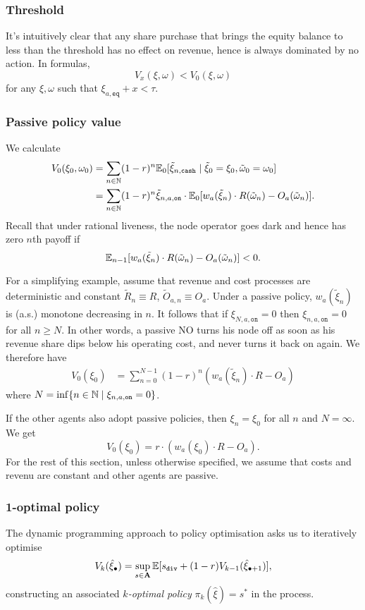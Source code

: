 \subsubsection{Threshold}
%
It's intuitively clear that any share purchase that brings the equity balance to less than the threshold has no effect on revenue, hence is always dominated by no action.
%
In formulas,
\[
  V_x(\xi,\omega) < V_0(\xi,\omega) 
\]
for any $\xi,\omega$ such that $\xi_{a,\mathtt{eq}}+x <\tau$.

\subsubsection{Passive policy value}

We calculate
\begin{align*}
  V_0(\xi_0,\omega_0) &= \sum_{n\in\mathbb{N}}(1-r)^n \mathbb{E}_0[\tilde\xi_{n,\mathtt{cash}} \mid \tilde\xi_0=\xi_0, \tilde\omega_0=\omega_0 ] \\
  &= \sum_{n\in\mathbb{N}}(1-r)^n \tilde\xi_{n,a,\mathtt{on}} \cdot \mathbb{E}_0[ w_a(\tilde\xi_n)\cdot R(\tilde\omega_n) - O_a(\tilde\omega_n) ].
\end{align*}
Recall that under rational liveness, the node operator goes dark and hence has zero $n$th payoff if 
\[
  \mathbb{E}_{n-1}[w_a(\tilde\xi_n)\cdot R(\tilde\omega_n) - O_a(\tilde\omega_n) ] < 0.
\]

For a simplifying example, assume that revenue and cost processes are deterministic and constant $\tilde{R}_n\equiv R$, $\tilde{O}_{a,n}\equiv O_a$.
%
Under a passive policy, $w_a(\tilde \xi_n)$ is (a.s.) monotone decreasing in $n$.
%
It follows that if $\xi_{N,a,\mathtt{on}}=0$ then $\xi_{n,a,\mathtt{on}}=0$ for all $n\geq N$.
%
In other words, a passive NO turns his node off as soon as his revenue share dips below his operating cost, and never turns it back on again.
%
We therefore have
\begin{align*}
  V_0(\xi_0) &= \sum_{n=0}^{N-1}(1-r)^n (w_a(\tilde\xi_n)\cdot R - O_a)
\end{align*}
where $N=\inf\{n\in\mathbb{N}\mid \xi_{n,a,\mathtt{on}}=0\}$.

If the other agents also adopt passive policies, then $\xi_n=\xi_0$ for all $n$ and $N=\infty$.
%
We get
\[
  V_0(\xi_0) = r\cdot (w_a(\xi_0)\cdot R - O_a).
\]
%
For the rest of this section, unless otherwise specified, we assume that costs and revenu are constant and other agents are passive.

\subsubsection{1-optimal policy} 
%
The dynamic programming approach to policy optimisation asks us to iteratively optimise
\[
  V_k(\hat{\xi}_\bullet) = \sup_{s\in\mathbf{A}} \mathbb{E}[s_\mathtt{div} + (1-r) V_{k-1}(\hat{\xi}_{\bullet+1}) ],
\]
constructing an associated \emph{$k$-optimal policy} $\pi_k(\hat{\xi})=s^*$ in the process.

